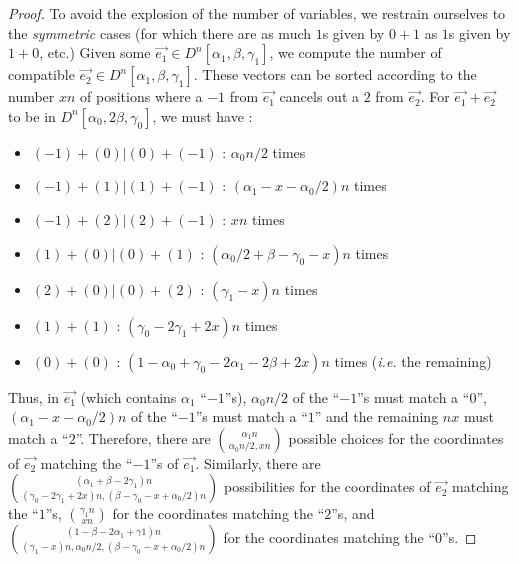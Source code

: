 \begin{proof}
To avoid the explosion of the number of variables, we restrain ourselves to the \textit{symmetric} cases (for which there are as much $1$s given by $0+1$ as $1$s given by $1+0$, etc.) Given some $\vec{e_1} \in D^n[\alpha_1, \beta, \gamma_1]$, we compute the number of compatible $\vec{e_2} \in D^n[\alpha_1, \beta, \gamma_1]$. These vectors can be sorted according to the number $x n$ of positions where a $-1$ from $\vec{e_1}$ cancels out a $2$ from $\vec{e_2}$. For $\vec{e_1} + \vec{e_2}$ to be in $D^n[\alpha_0, 2\beta, \gamma_0]$, we must have :
\begin{itemize}
\item $(-1) + (0) | (0) + (-1)$ : $\alpha_0 n/2$ times
\item $(-1) + (1) | (1) + (-1)$ : $(\alpha_1 - x - \alpha_0/2)n$ times
\item $(-1) + (2) | (2) + (-1)$ : $x n$ times
\item $(1) + (0) | (0) + (1)$ : $(\alpha_0/2 + \beta - \gamma_0 - x)n$ times
\item $(2) + (0) | (0) + (2)$ : $(\gamma_1 - x)n$ times
\item $(1) + (1)$ : $(\gamma_0 - 2\gamma_1 + 2 x)n$ times
\item $(0) + (0)$ : $(1 - \alpha_0 + \gamma_0 - 2\alpha_1 - 2\beta + 2x)n$ times (\emph{i.e.} the remaining)
\end{itemize}
Thus, in $\vec{e_1}$ (which contains $\alpha_1$ ``$-1$''s), $\alpha_0 n/2$ of the ``$-1$''s must match a ``$0$'', $(\alpha_1 - x - \alpha_0/2)n$ of the ``$-1$''s must match a ``$1$'' and the remaining $nx$ must match a ``$2$''. Therefore, there are ${\alpha_1 n \choose \alpha_0 n/2, x n}$ possible choices for the coordinates of $\vec{e_2}$ matching the ``$-1$''s of $\vec{e_1}$. Similarly, there are ${(\alpha_1+\beta-2\gamma_1) n \choose (\gamma_0-2\gamma_1+2x) n, (\beta-\gamma_0-x+\alpha_0/2) n}$ possibilities for the coordinates of $\vec{e_2}$ matching the ``$1$''s, ${\gamma_1 n \choose x n}$ for the coordinates matching the ``$2$''s, and ${(1-\beta-2\alpha_1+\gamma1) n \choose (\gamma_1-x) n, \alpha_0 n/2, (\beta-\gamma_0-x+\alpha_0/2)n}$ for the coordinates matching the ``$0$''s.


\end{proof}
